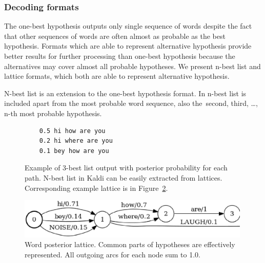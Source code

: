 \subsubsection*{Decoding formats}
The one-best hypothesis outputs only single sequence of words despite the fact that other sequences of words are often almost as probable as the best hypothesis.
Formats which are able to represent alternative hypothesis provide better results for further processing than one-best hypothesis because the alternatives may cover almost all probable hypotheses.
We present n-best list and lattice formats, which both are able to represent alternative hypothesis.

N-best list is an extension to the one-best hypothesis format. 
In n-best list is included apart from the most probable word sequence, also the~second, third, \ldots, n-th most probable hypothesis. 

\begin{figure}[!htp]
    \begin{center}
\begin{verbatim}
    0.5 hi how are you
    0.2 hi where are you
    0.1 bey how are you
\end{verbatim}
\caption{Example of 3-best list output with posterior probability for each path. 
N-best list in Kaldi can be easily extracted from lattices. 
Corresponding example lattice is in Figure~\ref{fig:toy_lat}.}
    \label{fig:nbest} 
    \end{center}
\end{figure}


\begin{figure}[!htp]
    \begin{center}
    \includegraphics[width=30em]{images/toy_lattice.ps}
    \caption{Word posterior lattice. 
        Common parts of hypotheses are effectively represented. 
        All outgoing arcs for each node sum to 1.0. }
    \label{fig:toy_lat} 
    \end{center}
\end{figure}

